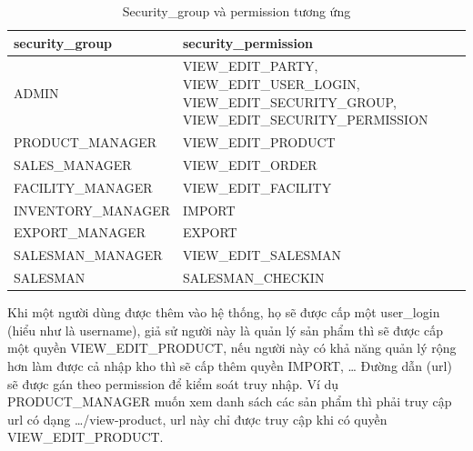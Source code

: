\begin{table}[H]
\centering
\begin{tabular}{| m{5cm} | m{11cm} |}
\hline
\textbf{security\_group} & \textbf{security\_permission} \\
\hline
ADMIN &
VIEW\_EDIT\_PARTY, VIEW\_EDIT\_USER\_LOGIN,
VIEW\_EDIT\_SECURITY\_GROUP,
VIEW\_EDIT\_SECURITY\_PERMISSION \\
\hline
PRODUCT\_MANAGER &
VIEW\_EDIT\_PRODUCT \\
\hline
SALES\_MANAGER & 
VIEW\_EDIT\_ORDER \\
\hline
FACILITY\_MANAGER & 
VIEW\_EDIT\_FACILITY \\
\hline
INVENTORY\_MANAGER & 
IMPORT \\
\hline
EXPORT\_MANAGER &
EXPORT \\
\hline
SALESMAN\_MANAGER &
VIEW\_EDIT\_SALESMAN \\
\hline
SALESMAN &
SALESMAN\_CHECKIN \\
\hline
\end{tabular}
\caption{Security\_group và permission tương ứng}
\end{table}

Khi một người dùng được thêm vào hệ thống, họ sẽ được cấp một
user\_login (hiểu như là username), giả sử người này là quản lý
sản phẩm thì sẽ được cấp một quyền VIEW\_EDIT\_PRODUCT, nếu người này
có khả năng quản lý rộng hơn làm được cả nhập kho thì sẽ cấp thêm
quyền IMPORT, … Đường dẫn (url) sẽ được gán theo permission để
kiểm soát truy nhập. Ví dụ PRODUCT\_MANAGER muốn xem danh sách các
sản phẩm thì phải truy cập url có dạng …/view-product,
url này chỉ được truy cập khi có quyền VIEW\_EDIT\_PRODUCT.



